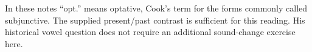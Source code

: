 In these notes “opt.” means optative, Cook’s term for the forms commonly called subjunctive. The supplied present/\allowbreak{}past contrast is sufficient for this reading. His historical vowel question does not require an additional sound-change exercise here.

\endgroup

